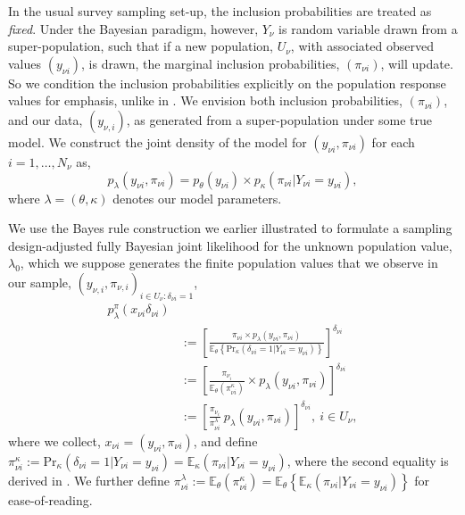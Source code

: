 \documentclass[]{imsart}
\begin{document}
In the usual survey sampling set-up, the inclusion probabilities are treated as \emph{fixed}.  Under the Bayesian paradigm, however, $Y_{\nu}$ is random variable drawn from a super-population, such that if a new population, $U_{\nu}$, with associated observed values $(y_{\nu i})$, is drawn, the marginal inclusion probabilities, $(\pi_{\nu i})$, will update.   So we condition the inclusion probabilities explicitly on the population response values for emphasis, unlike in \citet{savitsky2016bayesian}.  We envision both inclusion probabilities, $(\pi_{\nu i})$, and our data, $(y_{\nu,i})$, as generated from a super-population under some true model.  We construct the joint density of the model for $(y_{\nu i},\pi_{\nu i})$ for each $i = 1,\ldots,N_{\nu}$ as,
\begin{equation}
p_{\lambda}\left(y_{\nu i},\pi_{\nu i}\right) = p_{\theta}\left(y_{\nu i}\right)\times p_{\kappa}\left(\pi_{\nu i}\vert Y_{\nu i}=y_{\nu i}\right),
\end{equation}
where $\lambda = (\theta,\kappa)$ denotes our model parameters.

We use the Bayes rule construction we earlier illustrated to formulate a sampling design-adjusted fully Bayesian joint likelihood for the unknown population value, $\lambda_{0}$, which we suppose generates the finite population values that we observe in our sample, $\left(y_{\nu,i},\pi_{\nu,i}\right)_{i\in U_{\nu}: \delta_{\nu i} = 1}$,
\begin{align}
p_{\lambda}^{\pi}\left(x_{\nu i}\delta_{\nu i}\right)& \\
&:= \left[\frac{\pi_{\nu i} \times p_{\lambda}\left(y_{\nu i},\pi_{\nu i}\right)}{\mathbb{E}_{\theta}\left\{\mbox{Pr}_{\kappa}\left(\delta_{\nu i} = 1\vert Y_{\nu i} = y_{\nu i}\right)\right\}}\right]^{\delta_{\nu i}}\\
&:= \left[\frac{\pi_{\nu_i}}{\mathbb{E}_{\theta}\left(\pi_{\nu i}^{\kappa}\right)}\times p_{\lambda}\left(y_{\nu i},\pi_{\nu i}\right)\right]^{\delta_{\nu i}}\\
&:= \left[\frac{\pi_{\nu_i}}{\pi_{\nu i}^{\lambda}}~p_{\lambda}\left(y_{\nu i},\pi_{\nu i}\right)\right]^{\delta_{\nu i}},~i \in U_{\nu}\label{bayesrule},
\end{align}
where we collect, $x_{\nu i} = \left(y_{\nu i},\pi_{\nu i}\right)$,
\newline
and define $\pi_{\nu i}^{\kappa} := \mbox{Pr}_{\kappa}\left(\delta_{\nu i} = 1\vert Y_{\nu i} = y_{\nu i}\right) =
\mathbb{E}_{\kappa}\left(\pi_{\nu i} \vert Y_{\nu i} = y_{\nu i}\right)$, where the second equality is derived in
\citet{pfeffermann1998parametric}. We further define $\pi_{\nu i}^{\lambda} := \mathbb{E}_{\theta}\left(\pi_{\nu i}^{\kappa}\right) = \mathbb{E}_{\theta}\left\{\mathbb{E}_{\kappa}\left(\pi_{\nu i} \vert Y_{\nu i} = y_{\nu i}\right)\right\}$ for ease-of-reading.
\end{document}
